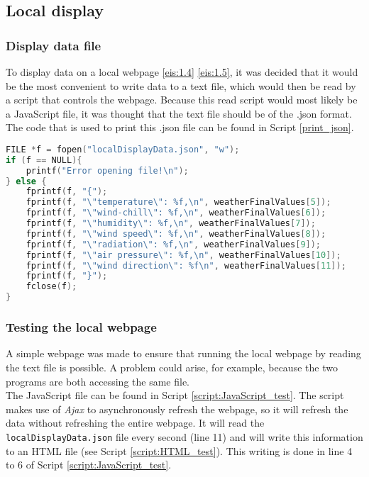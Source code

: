 \subsection{Local display}\label{sec:display}
\subsubsection{Display data file}
To display data on a local webpage \ref{eis:1.4} \ref{eis:1.5}, it was decided that it would be the most convenient to write data to a text file, which would then be read by a script that controls the webpage. Because this read script would most likely be a JavaScript file, it was thought that the text file should be of the .json format. The code that is used to print this .json file can be found in Script \ref{print_json}.

\scriptsize
\begin{lstlisting}[language=C,caption={Writing a .json file for the local webpage},label={print_json}]
FILE *f = fopen("localDisplayData.json", "w");
if (f == NULL){
	printf("Error opening file!\n");
} else {
	fprintf(f, "{");
	fprintf(f, "\"temperature\": %f,\n", weatherFinalValues[5]);
	fprintf(f, "\"wind-chill\": %f,\n", weatherFinalValues[6]);
	fprintf(f, "\"humidity\": %f,\n", weatherFinalValues[7]);
	fprintf(f, "\"wind speed\": %f,\n", weatherFinalValues[8]);
	fprintf(f, "\"radiation\": %f,\n", weatherFinalValues[9]);
	fprintf(f, "\"air pressure\": %f,\n", weatherFinalValues[10]);
	fprintf(f, "\"wind direction\": %f\n", weatherFinalValues[11]);
	fprintf(f, "}");
	fclose(f);
}
\end{lstlisting}
\normalsize

\subsubsection{Testing the local webpage}
A simple webpage was made to ensure that running the local webpage by reading the text file is possible. A problem could arise, for example, because the two programs are both accessing the same file.\\

The JavaScript file can be found in Script \ref{script:JavaScript_test}. The script makes use of \textit{Ajax} \cite{jquery} to asynchronously refresh the webpage, so it will refresh the data without refreshing the entire webpage. It will read the \verb|localDisplayData.json| file every second (line 11) and will write this information to an HTML file (see Script \ref{script:HTML_test}). This writing is done in line 4 to 6 of Script \ref{script:JavaScript_test}.\\

